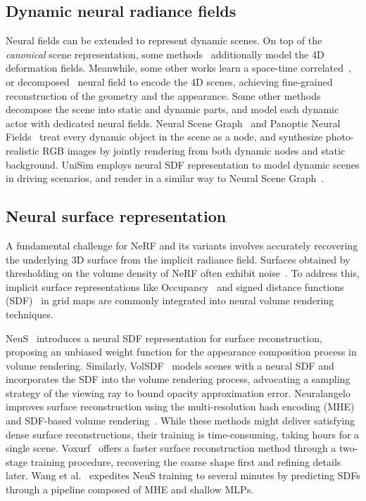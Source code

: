 \subsection{Dynamic neural radiance fields} 
Neural fields \cite{xie2022neural} can be extended to represent dynamic scenes. On top of the \textit{canonical} scene representation, some methods~\cite{pumarola2020d, park2021nerfies, park2021hypernerf,yuan2021star} additionally model the 4D deformation fields. Meanwhile, some other works learn a space-time correlated~\cite{kplanes_2023, li2020neural, attal2023hyperreel, liu2023robust}, or decomposed~\cite{turki2023suds,wu2022d,yang2023emernerf} neural field to encode the 4D scenes, achieving fine-grained reconstruction of the geometry and the appearance.
%
Some other methods decompose the scene into static and dynamic parts, and model each dynamic actor with dedicated neural fields. 
Neural Scene Graph~\cite{Ost_2021_CVPR} and Panoptic Neural Fields~\cite{KunduCVPR2022PNF} treat every dynamic object in the scene as a node, and synthesize photo-realistic RGB images by jointly rendering from both dynamic nodes and static background. UniSim\cite{yang2023unisim} employs neural SDF representation to model dynamic scenes in driving scenarios, and render in a similar way to Neural Scene Graph~\cite{Ost_2021_CVPR}.


\subsection{Neural surface representation}
A fundamental challenge for NeRF and its variants involves accurately recovering the underlying 3D surface from the implicit radiance field. Surfaces obtained by thresholding on the volume density of NeRF often exhibit noise~\cite{wang2021neus, yariv2021volume}. To address this, implicit surface representations like Occupancy~\cite{niemeyer2020differentiable, oechsle2021unisurf} and signed distance functions (SDF)~\cite{wang2021neus, yariv2021volume, yu2022monosdf, sun2022neural, wang2022hf, zuo2023incremental, li2023neuralangelo, wang2023neus2} in grid maps are commonly integrated into neural volume rendering techniques.

NeuS~\cite{wang2021neus} introduces a neural SDF representation for surface reconstruction, proposing an unbiased weight function for the appearance composition process in volume rendering. Similarly, VolSDF~\cite{yariv2021volume} models scenes with a neural SDF and incorporates the SDF into the volume rendering process, advocating a sampling strategy of the viewing ray to bound opacity approximation error. Neuralangelo~\cite{li2023neuralangelo} improves surface reconstruction using the multi-resolution hash encoding (MHE)~\cite{mueller2022instant} and SDF-based volume rendering~\cite{wang2021neus}. While these methods might deliver satisfying dense surface reconstructions, their training is time-consuming, taking hours for a single scene.
Voxurf~\cite{wu2022voxurf} offers a faster surface reconstruction method through a two-stage training procedure, recovering the coarse shape first and refining details later. Wang et al.~\cite{wang2023neus2} expedites NeuS training to several minutes by predicting SDFs through a pipeline composed of MHE and shallow MLPs.

